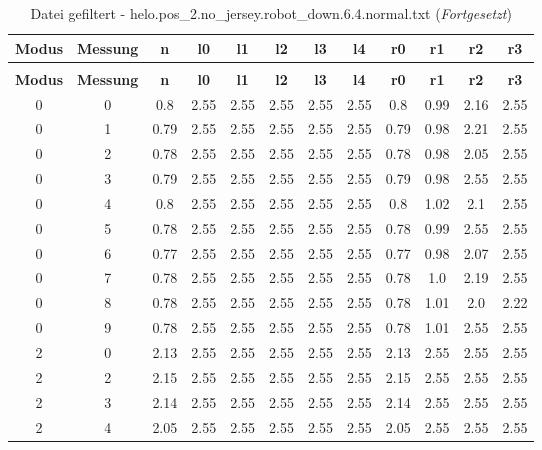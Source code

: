 \begin{longtable}{|c|c||c||c|c|c|c|c||c|c|c|c|}
	\caption{Datei gefiltert - helo.pos\_2.no\_jersey.robot\_down.6.4.normal.txt} \label{tab:helo.pos-2.no-jersey.robot-down.6.4.normal.txt} \\ \hline
	\textbf{Modus} & \textbf{Messung} & \textbf{n} & \textbf{l0} & \textbf{l1} & \textbf{l2} & \textbf{l3} & \textbf{l4} & \textbf{r0} & \textbf{r1} & \textbf{r2} & \textbf{r3}\\ \hline
	\endfirsthead
	\caption[]{Datei gefiltert - helo.pos\_2.no\_jersey.robot\_down.6.4.normal.txt (\emph{Fortgesetzt})} \\ \hline
	\textbf{Modus} & \textbf{Messung} & \textbf{n} & \textbf{l0} & \textbf{l1} & \textbf{l2} & \textbf{l3} & \textbf{l4} & \textbf{r0} & \textbf{r1} & \textbf{r2} & \textbf{r3}\\ \hline
	\endhead
	0 & 0 & 0.8 & 2.55 & 2.55 & 2.55 & 2.55 & 2.55 & 0.8 & 0.99 & 2.16 & 2.55 \\ \hline
	0 & 1 & 0.79 & 2.55 & 2.55 & 2.55 & 2.55 & 2.55 & 0.79 & 0.98 & 2.21 & 2.55 \\ \hline
	0 & 2 & 0.78 & 2.55 & 2.55 & 2.55 & 2.55 & 2.55 & 0.78 & 0.98 & 2.05 & 2.55 \\ \hline
	0 & 3 & 0.79 & 2.55 & 2.55 & 2.55 & 2.55 & 2.55 & 0.79 & 0.98 & 2.55 & 2.55 \\ \hline
	0 & 4 & 0.8 & 2.55 & 2.55 & 2.55 & 2.55 & 2.55 & 0.8 & 1.02 & 2.1 & 2.55 \\ \hline
	0 & 5 & 0.78 & 2.55 & 2.55 & 2.55 & 2.55 & 2.55 & 0.78 & 0.99 & 2.55 & 2.55 \\ \hline
	0 & 6 & 0.77 & 2.55 & 2.55 & 2.55 & 2.55 & 2.55 & 0.77 & 0.98 & 2.07 & 2.55 \\ \hline
	0 & 7 & 0.78 & 2.55 & 2.55 & 2.55 & 2.55 & 2.55 & 0.78 & 1.0 & 2.19 & 2.55 \\ \hline
	0 & 8 & 0.78 & 2.55 & 2.55 & 2.55 & 2.55 & 2.55 & 0.78 & 1.01 & 2.0 & 2.22 \\ \hline
	0 & 9 & 0.78 & 2.55 & 2.55 & 2.55 & 2.55 & 2.55 & 0.78 & 1.01 & 2.55 & 2.55 \\ \hline
	2 & 0 & 2.13 & 2.55 & 2.55 & 2.55 & 2.55 & 2.55 & 2.13 & 2.55 & 2.55 & 2.55 \\ \hline
	2 & 2 & 2.15 & 2.55 & 2.55 & 2.55 & 2.55 & 2.55 & 2.15 & 2.55 & 2.55 & 2.55 \\ \hline
	2 & 3 & 2.14 & 2.55 & 2.55 & 2.55 & 2.55 & 2.55 & 2.14 & 2.55 & 2.55 & 2.55 \\ \hline
	2 & 4 & 2.05 & 2.55 & 2.55 & 2.55 & 2.55 & 2.55 & 2.05 & 2.55 & 2.55 & 2.55 \\ \hline

\end{longtable}
